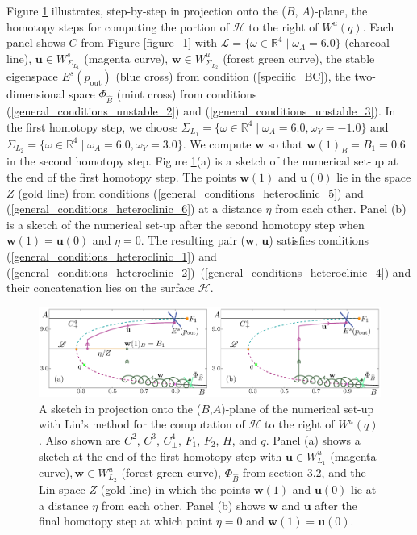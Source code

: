 \documentclass{ws-ijbc}
\begin{document}
Figure \ref{figure_10} illustrates, step-by-step in projection onto the ($B$, $A$)-plane, the homotopy steps for computing the portion of $\mathscr{H}$ to the right of $W^u(q)$.  
Each panel shows $C$ from Figure \ref{figure_1} with $\mathscr{L} = \{ \omega \in \mathbb{R}^4 \; | \; \omega_A = 6.0 \}$ (charcoal line), $\mathbf{u} \in W^s_{\Sigma_{L_1}}$ (magenta curve), $\mathbf{w} \in W^u_{\Sigma_{L_2}}$ (forest green curve), the stable eigenspace $E^s(p_{\text{out}})$ (blue cross) from condition (\ref{specific_BC}), the two-dimensional space $\Phi_{\widehat{B}}$ (mint cross) from conditions (\ref{general_conditions_unstable_2}) and (\ref{general_conditions_unstable_3}).  
In the first homotopy step, we choose $\Sigma_{L_1}=\{ \omega \in \mathbb{R}^4 \; | \; \omega_A = 6.0, \omega_Y=-1.0 \}$ and $\Sigma_{L_2}=\{ \omega \in \mathbb{R}^4 \; | \; \omega_A = 6.0, \omega_Y=3.0 \}$.  We compute $\mathbf{w}$ so that $\mathbf{w}(1)_B = B_1 = 0.6$ in the second homotopy step.  Figure \ref{figure_10}(a) is a sketch of the numerical set-up at the end of the first homotopy step.  The points $\mathbf{w}(1)$ and $\mathbf{u}(0)$ lie in the space $Z$ (gold line) from conditions (\ref{general_conditions_heteroclinic_5}) and (\ref{general_conditions_heteroclinic_6}) at a distance $\eta$ from each other.  Panel (b) is a sketch of the numerical set-up after the second homotopy step when $\mathbf{w}(1) = \mathbf{u}(0)$ and $\eta=0$.  The resulting pair ($\mathbf{w}$, $\mathbf{u}$) satisfies conditions (\ref{general_conditions_heteroclinic_1}) and (\ref{general_conditions_heteroclinic_2})--(\ref{general_conditions_heteroclinic_4}) and their concatenation lies on the surface $\mathscr{H}$.


\begin{figure}[H]
\centering
\includegraphics[]{./figures/MKMO_10.pdf}
\caption{A sketch in projection onto the ($B$,$A$)-plane of the numerical set-up with Lin's method for the computation of $\mathscr{H}$ to the right of $W^u(q)$.  Also shown are $C^2$, $C^3$, $C^4_\pm$, $F_1$, $F_2$, $H$, and $q$.  Panel (a) shows a sketch at the end of the first homotopy step with $\mathbf{u} \in W^u_{L_1}$ (magenta curve)$, \mathbf{w} \in W^u_{L_2}$ (forest green curve), $\Phi_{\widehat{B}}$ from section 3.2, and the Lin space $Z$ (gold line) in which the points $\mathbf{w}(1)$ and $\mathbf{u}(0)$ lie at a distance $\eta$ from each other.  Panel (b) shows $\mathbf{w}$ and $\mathbf{u}$ after the final homotopy step at which point $\eta=0$ and $\mathbf{w}(1)=\mathbf{u}(0)$.}
\label{figure_10}
\end{figure}
\end{document}
